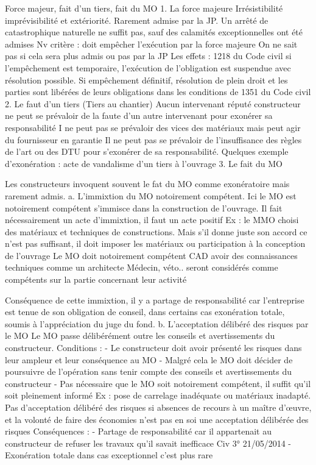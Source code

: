 		Force majeur, fait d’un tiers, fait du MO
		1.	La force majeure
		Irrésistibilité imprévisibilité et extériorité. Rarement admise par la JP. Un arrêté de catastrophique naturelle ne suffit pas, sauf des calamités exceptionnelles ont été admises
		Nv critère : doit empêcher l’exécution par la force majeure On ne sait pas si cela sera plus admis ou pas par la JP
		Les effets : 1218 du Code civil si l’empêchement est temporaire, l’exécution de l’obligation est suspendue avec résolution possible. Si empêchement définitif, résolution de plein droit et les parties sont libérées de leurs obligations dans les conditions de 1351 du Code civil
		2.	Le faut d’un tiers (Tiers au chantier)
		Aucun intervenant réputé constructeur ne peut se prévaloir de la faute d’un autre intervenant pour exonérer sa responsabilité
		I ne peut pas se prévaloir des vices des matériaux mais peut agir du fournisseur en garantie
		Il ne peut pas se prévaloir de l’insuffisance des règles de l’art ou des DTU pour s’exonérer de sa responsabilité.
		Quelques exemple d’exonération : acte de vandalisme d’un tiers à l’ouvrage
		3.	Le fait du MO

		Les constructeurs invoquent souvent le fat du MO comme exonératoire mais rarement admis.
		a.	L’immixtion du MO notoirement compétent.
		Ici le MO est notoirement compétent s’immisce dans la construction de l’ouvrage.
		Il fait nécessairement un acte d’immixtion, il faut un acte positif
		Ex : le MMO choisi des matériaux et techniques de constructions. Mais s’il donne juste son accord ce n’est pas suffisant, il doit imposer les matériaux ou participation à la conception de l’ouvrage
		Le MO doit notoirement compétent CAD avoir des connaissances techniques comme un architecte
		Médecin, véto.. seront considérés comme compétents sur la partie concernant leur activité

		Conséquence de cette immixtion, il y a partage de responsabilité car l’entreprise est tenue de son obligation de conseil, dans certains cas exonération totale, soumis à l’appréciation du juge du fond.
		b.	L’acceptation délibéré des risques par le MO
		Le MO passe délibérément outre les conseils et avertissements du constructeur.
		Conditions :
		-	Le constructeur doit avoir présenté les risques dans leur ampleur et leur conséquence au MO
		-	Malgré cela le MO doit décider de poursuivre de l’opération sans tenir compte des conseils et avertissements du constructeur
		-	Pas nécessaire que le MO soit notoirement compétent, il suffit qu’il soit pleinement informé
		Ex : pose de carrelage inadéquate ou matériaux inadapté.
		Pas d’acceptation délibéré des risques si absences de recours à un maître d’œuvre, et la volonté de faire des économies n’est pas en soi une acceptation délibérée des risques
		Conséquences :
		-	Partage de responsabilité car il appartenait au constructeur de refuser les travaux qu’il savait inefficace Civ 3° 21/05/2014
		-	Exonération totale dans cas exceptionnel c’est plus rare

